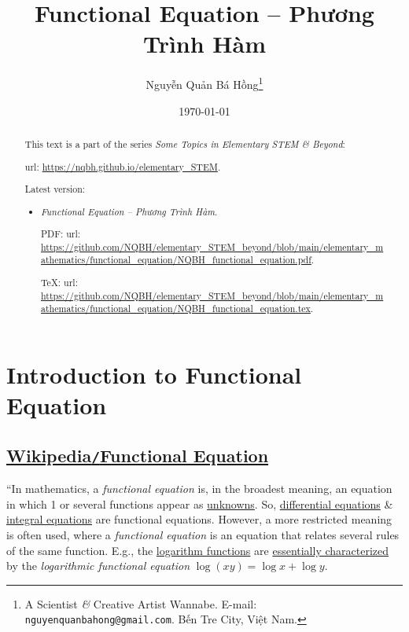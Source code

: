 \documentclass{article}
\title{Functional Equation -- Phương Trình Hàm}
\author{Nguyễn Quản Bá Hồng\footnote{A Scientist {\it\&} Creative Artist Wannabe. E-mail: {\tt nguyenquanbahong@gmail.com}. Bến Tre City, Việt Nam.}}
\date{\today}
\begin{document}
\maketitle
\begin{abstract}
	This text is a part of the series {\it Some Topics in Elementary STEM \& Beyond}:
	
	{\sc url}: \url{https://nqbh.github.io/elementary_STEM}.
	
	Latest version:
	\begin{itemize}
		\item {\it Functional Equation -- Phương Trình Hàm}.
		
		PDF: {\sc url}: \url{https://github.com/NQBH/elementary_STEM_beyond/blob/main/elementary_mathematics/functional_equation/NQBH_functional_equation.pdf}.
		
		\TeX: {\sc url}: \url{https://github.com/NQBH/elementary_STEM_beyond/blob/main/elementary_mathematics/functional_equation/NQBH_functional_equation.tex}.
	\end{itemize}
\end{abstract}
\tableofcontents


\section{Introduction to Functional Equation}

\subsection{\href{https://en.wikipedia.org/wiki/Functional_equation}{Wikipedia\texttt{/}Functional Equation}}
``In mathematics, a \textit{functional equation} is, in the broadest meaning, an equation in which 1 or several functions appear as \href{https://en.wikipedia.org/wiki/Unknown_(mathematics)}{unknowns}. So, \href{https://en.wikipedia.org/wiki/Differential_equation}{differential equations} \& \href{https://en.wikipedia.org/wiki/Integral_equation}{integral equations} are functional equations. However, a more restricted meaning is often used, where a \textit{functional equation} is an equation that relates several rules of the same function. E.g., the \href{https://en.wikipedia.org/wiki/Logarithm_function}{logarithm functions} are \href{https://en.wikipedia.org/wiki/Logarithm#Characterization_by_the_product_formula}{essentially characterized} by the \textit{logarithmic functional equation} $\log(xy) = \log x + \log y$.
\end{document}

